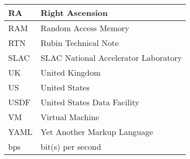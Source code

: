 \begin{longtable}{p{}p{}}
RA & Right Ascension \\\hline
RAM & Random Access Memory \\\hline
RTN & Rubin Technical Note \\\hline
SLAC & SLAC National Accelerator Laboratory \\\hline
UK & United Kingdom \\\hline
US & United States \\\hline
USDF & United States Data Facility \\\hline
VM & Virtual Machine \\\hline
YAML & Yet Another Markup Language \\\hline
bps & bit(s) per second \\\hline
\end{longtable}
